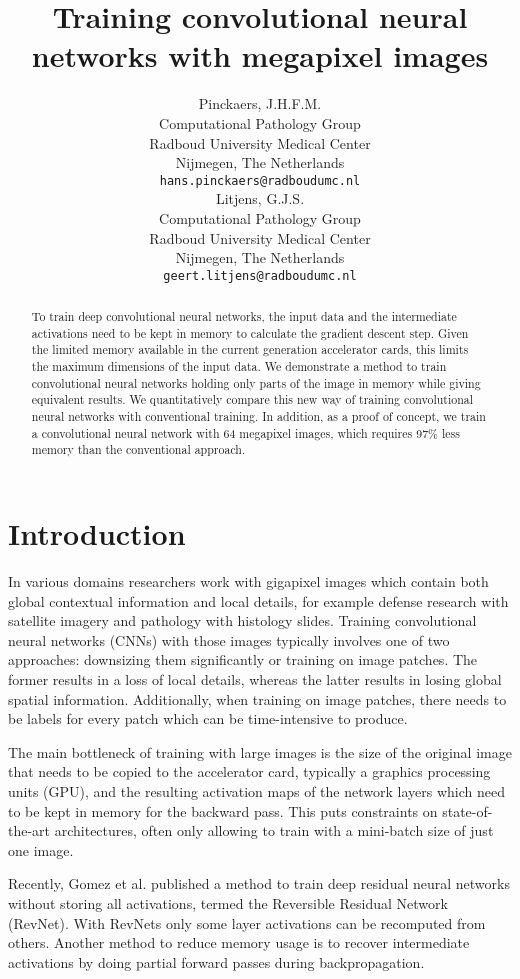 \documentclass{article}
\title{Training convolutional neural networks with megapixel images}
\author{
  Pinckaers, J.H.F.M. \\
  Computational Pathology Group\\
  Radboud University Medical Center\\
  Nijmegen, The Netherlands\\
  \texttt{hans.pinckaers@radboudumc.nl} \\
  \And
  Litjens, G.J.S. \\
  Computational Pathology Group\\
  Radboud University Medical Center\\
  Nijmegen, The Netherlands\\
  \texttt{geert.litjens@radboudumc.nl} \\
}
\begin{document}
\maketitle

\begin{abstract}
  To train deep convolutional neural networks, the input data and the intermediate activations need to be kept in memory to calculate the gradient descent step. Given the limited memory available in the current generation accelerator cards, this limits the maximum dimensions of the input data. We demonstrate a method to train convolutional neural networks holding only parts of the image in memory while giving equivalent results. We quantitatively compare this new way of training convolutional neural networks with conventional training. In addition, as a proof of concept, we train a convolutional neural network with 64 megapixel images, which requires 97\% less memory than the conventional approach.
\end{abstract}

\section{Introduction}
In various domains researchers work with gigapixel images which contain both global contextual information and local details, for example defense research with satellite imagery and pathology with histology slides. Training convolutional neural networks (CNNs) with those images typically involves one of two approaches: downsizing them significantly or training on image patches. The former results in a loss of local details, whereas the latter results in losing global spatial information. Additionally, when training on image patches, there needs to be labels for every patch which can be time-intensive to produce.
 
The main bottleneck of training with large images is the size of the original image that needs to be copied to the accelerator card, typically a graphics processing units (GPU), and the resulting activation maps of the network layers which need to be kept in memory for the backward pass. This puts constraints on state-of-the-art architectures, often only allowing to train with a mini-batch size of just one image. 

Recently, Gomez et al.\cite{DBLP:journals/corr/GomezRUG17} published a method to train deep residual neural networks without storing all activations, termed the Reversible Residual Network (RevNet). With RevNets only some layer activations can be recomputed from others. Another method to reduce memory usage is to recover intermediate activations by doing partial forward passes during backpropagation\cite{DBLP:journals/corr/ChenXZG16}.
\end{document}
